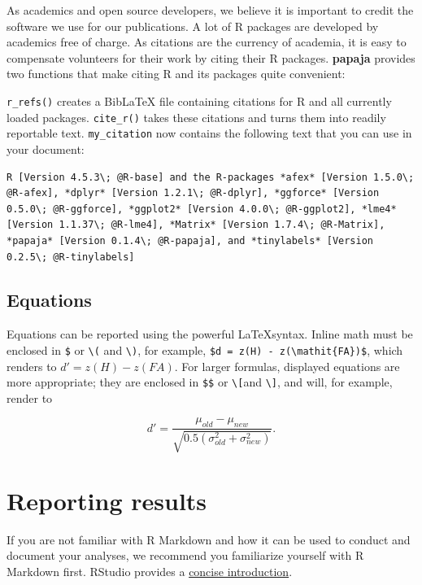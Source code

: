 \documentclass[
  english,
  ,man,floatsintext]{apa6}
\begin{document}
As academics and open source developers, we believe it is important to credit the software we use for our publications.
A lot of R packages are developed by academics free of charge.
As citations are the currency of academia, it is easy to compensate volunteers for their work by citing their R packages.
\textbf{papaja} provides two functions that make citing R and its packages quite convenient:

\texttt{r\_refs()} creates a BibLaTeX file containing citations for R and all currently loaded packages.
\texttt{cite\_r()} takes these citations and turns them into readily reportable text.
\texttt{my\_citation} now contains the following text that you can use in your document:

\begin{Verbatim}[breaklines=true]
R [Version 4.5.3\; @R-base] and the R-packages *afex* [Version 1.5.0\; @R-afex], *dplyr* [Version 1.2.1\; @R-dplyr], *ggforce* [Version 0.5.0\; @R-ggforce], *ggplot2* [Version 4.0.0\; @R-ggplot2], *lme4* [Version 1.1.37\; @R-lme4], *Matrix* [Version 1.7.4\; @R-Matrix], *papaja* [Version 0.1.4\; @R-papaja], and *tinylabels* [Version 0.2.5\; @R-tinylabels]
\end{Verbatim}

\subsection{Equations}\label{equations}

Equations can be reported using the powerful \LaTeX syntax.
Inline math must be enclosed in \texttt{\$} or \texttt{\textbackslash{}(} and \texttt{\textbackslash{})}, for example, \texttt{\$d\textquotesingle{}\ =\ z(H)\ -\ z(\textbackslash{}mathit\{FA\})\$}, which renders to \(d' = z(H) - z(\mathit{FA})\).
For larger formulas, displayed equations are more appropriate; they are enclosed in \texttt{\$\$} or \texttt{\textbackslash{}{[}}and \texttt{\textbackslash{}{]}}, and will, for example, render to

\[
d' = \frac{\mu_{old} - \mu_{new}}{\sqrt{0.5(\sigma^2_{old} + \sigma^2_{new})}}.
\]

\section{Reporting results}\label{reporting-results}

If you are not familiar with R Markdown and how it can be used to conduct and document your analyses, we recommend you familiarize yourself with R Markdown first.
RStudio provides a \href{https://rmarkdown.rstudio.com/lesson-1.html}{concise introduction}.
\end{document}
